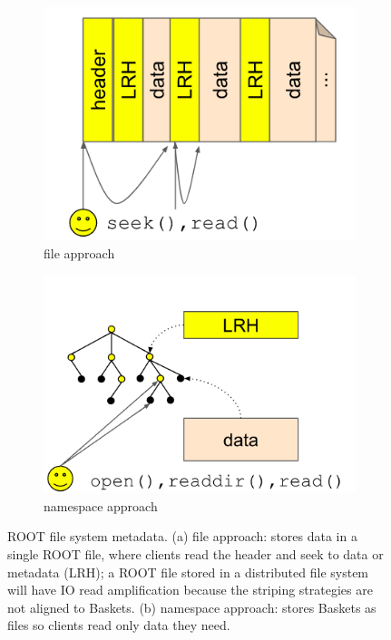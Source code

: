 \begin{figure}[tb]
    \centering
    \begin{subfigure}[b]{.45\linewidth}
      \centering
      \includegraphics[width=1.0\linewidth]{./chapters/tintenfisch/figures/tree_hep_a.png} 
      \caption{file approach}
      \label{fig:tree_hep_a}
    \end{subfigure}
    \begin{subfigure}[b]{.45\linewidth}
      \centering
      \includegraphics[width=1.0\linewidth]{./chapters/tintenfisch/figures/tree_hep_b.png} 
      \caption{namespace approach}
      \label{fig:tree_hep_b}
    \end{subfigure}
\caption{ROOT file system metadata. (a) file approach: stores data in a single
ROOT file, where clients read the header and seek to data or metadata (LRH); a
ROOT file stored in a distributed file system will have IO read amplification
because the striping strategies are not aligned to Baskets. (b) namespace
approach: stores Baskets as files so clients read only data they need.}
\end{figure}

